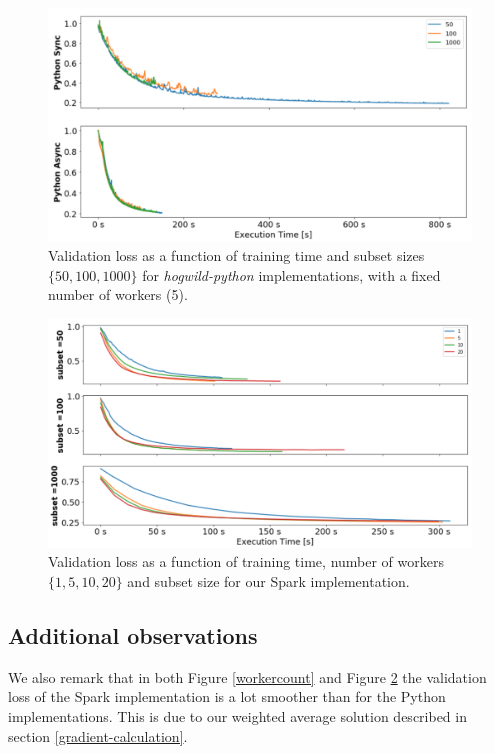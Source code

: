 \documentclass[a4paper, 11pt, conference]{ieeeconf}
\begin{document}
\begin{figure}[ht]
  \centering
  \includegraphics[scale=0.35]{subsetpy.png}
  \caption{Validation loss as a function of training time and subset sizes $\{50, 100, 1000\}$ for \textit{hogwild-python} implementations, with a fixed number of workers (5).}
  \label{subsetpy}
\end{figure}

\begin{figure}[ht]
  \centering
  \includegraphics[scale=0.35]{spark-subset.png}
  \caption{Validation loss as a function of training time, number of workers  $\{1, 5, 10, 20\}$ and subset size for our Spark implementation.}
  \label{subsetspark}
\end{figure}


\subsection{Additional observations}
We also remark that in both Figure \ref{workercount} and Figure \ref{subsetspark} the validation loss of the Spark implementation is a lot smoother than for the Python implementations. This is due to our weighted average solution described in section \ref{gradient-calculation}.
\end{document}
